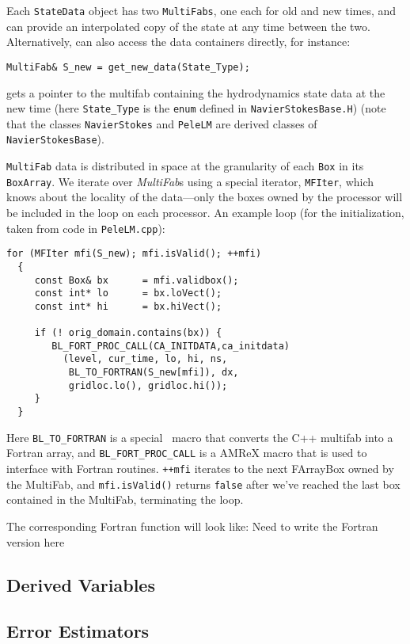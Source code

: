 Each {\tt StateData} object has two {\tt MultiFabs}, one each for 
old and new times, and can provide an interpolated copy of the state at any time between the two.
Alternatively, can also access the data containers directly, for instance:
\begin{lstlisting}
MultiFab& S_new = get_new_data(State_Type);
\end{lstlisting}
gets a pointer to the multifab containing the hydrodynamics state data
at the new time (here {\tt State\_Type} is the {\tt enum} defined in 
{\tt NavierStokesBase.H}) (note that the classes {\tt NavierStokes} 
and {\tt PeleLM} are derived classes of {\tt NavierStokesBase}).

{\tt MultiFab} data is distributed in space at the granularity of 
each {\tt Box} in its {\tt BoxArray}.  We iterate over {\it MultiFab}s using a special
iterator, {\tt MFIter}, which knows about the locality of the data---only the boxes owned by the
processor will be included in the loop on each processor.  An example loop (for the
initialization, taken from code in {\tt PeleLM.cpp}):
\begin{lstlisting}
for (MFIter mfi(S_new); mfi.isValid(); ++mfi)
  {
     const Box& bx      = mfi.validbox();
     const int* lo      = bx.loVect();
     const int* hi      = bx.hiVect();

     if (! orig_domain.contains(bx)) {
        BL_FORT_PROC_CALL(CA_INITDATA,ca_initdata)
          (level, cur_time, lo, hi, ns,
           BL_TO_FORTRAN(S_new[mfi]), dx,
           gridloc.lo(), gridloc.hi());
     }
  }
\end{lstlisting}
Here {\tt BL\_TO\_FORTRAN} is a special \amrex\ macro that converts the
C++ multifab into a Fortran array, and {\tt BL\_FORT\_PROC\_CALL}
is a AMReX macro that is used to interface with Fortran routines. 
{\tt ++mfi} iterates to the next FArrayBox owned by the MultiFab, 
and {\tt mfi.isValid()} returns {\tt false} after we've reached 
the last box contained in the MultiFab, terminating the loop.

The corresponding Fortran function will look like:
{\color{red} Need to write the Fortran version here}


\subsection{Derived Variables}

\subsection{Error Estimators}


